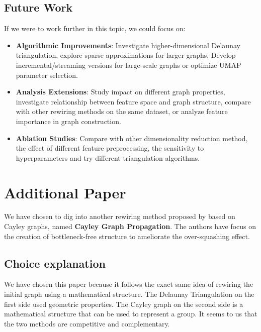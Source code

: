 \documentclass{article}
\theoremstyle{plain}
\theoremstyle{definition}
\theoremstyle{remark}
\begin{document}
\subsection{Future Work}
If we were to work further in this topic, we could focus on:
\begin{itemize}
    \item \textbf{Algorithmic Improvements}: Investigate higher-dimensional 
    Delaunay triangulation, explore sparse approximations for larger graphs, 
   Develop incremental/streaming versions for large-scale graphs or 
   optimize UMAP parameter selection.

    \item \textbf{Analysis Extensions}:
   Study impact on different graph properties, 
   investigate relationship between feature space and graph structure,
   compare with other rewiring methods on the same dataset,
   or analyze feature importance in graph construction.

    \item \textbf{Ablation Studies}:
   Compare with other dimensionality reduction method, the effect of different 
   feature preprocessing, the sensitivity to hyperparameters and try different
    triangulation algorithms.
\end{itemize}

\section{Additional Paper}
We have chosen to dig into another rewiring method proposed by \cite{wilson2024cayleygraphpropagation}
based on Cayley graphs, named \textbf{Cayley Graph Propagation}. 
The authors have focus on the creation of bottleneck-free
structure to ameliorate the over-squashing effect. 

\subsection{Choice explanation}
We have chosen this paper because it follows the exact same idea of rewiring
the initial graph using a mathematical structure. The Delaunay Triangulation
on the first side used geometric properties. The Cayley graph on the second side
is a mathematical structure that can be used to represent a group. It seems
to us that the two methods are competitive and complementary.
\end{document}
